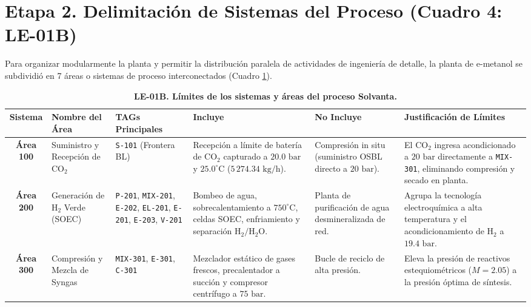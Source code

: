 \documentclass[10pt,letterpaper]{article}
\begin{document}
\section{Etapa 2. Delimitación de Sistemas del Proceso (Cuadro 4: LE-01B)}

Para organizar modularmente la planta y permitir la distribución paralela de actividades de ingeniería de detalle, la planta de e-metanol se subdividió en 7 áreas o sistemas de proceso interconectados (Cuadro \ref{tab:cuadro4}).

\begin{table}[H]
\centering
\small
\caption{\textbf{LE-01B. Límites de los sistemas y áreas del proceso Solvanta.}} \label{tab:cuadro4}
\begin{tabularx}{\textwidth}{c p{2.2cm} p{1.8cm} p{3.0cm} p{2.2cm} X}
\toprule
\textbf{Sistema} & \textbf{Nombre del Área} & \textbf{TAGs Principales} & \textbf{Incluye} & \textbf{No Incluye} & \textbf{Justificación de Límites} \\
\midrule
\textbf{Área 100} & Suministro y Recepción de $\text{CO}_2$ & \texttt{S-101} (Frontera BL) & Recepción a límite de batería de $\text{CO}_2$ capturado a $20.0\text{ bar}$ y $25.0^\circ\text{C}$ ($5\,274.34\text{ kg/h}$). & Compresión in situ (suministro OSBL directo a $20\text{ bar}$). & El $\text{CO}_2$ ingresa acondicionado a $20\text{ bar}$ directamente a \texttt{MIX-301}, eliminando compresión y secado en planta. \\
\textbf{Área 200} & Generación de $\text{H}_2$ Verde (SOEC) & \texttt{P-201}, \texttt{MIX-201}, \texttt{E-202}, \texttt{EL-201}, \texttt{E-201}, \texttt{E-203}, \texttt{V-201} & Bombeo de agua, sobrecalentamiento a $750^\circ\text{C}$, celdas SOEC, enfriamiento y separación $\text{H}_2/\text{H}_2\text{O}$. & Planta de purificación de agua desmineralizada de red. & Agrupa la tecnología electroquímica a alta temperatura y el acondicionamiento de $\text{H}_2$ a $19.4\text{ bar}$. \\
\textbf{Área 300} & Compresión y Mezcla de Syngas & \texttt{MIX-301}, \texttt{E-301}, \texttt{C-301} & Mezclador estático de gases frescos, precalentador a succión y compresor centrífugo a $75\text{ bar}$. & Bucle de reciclo de alta presión. & Eleva la presión de reactivos estequiométricos ($M=2.05$) a la presión óptima de síntesis. \\

\end{tabularx}
\end{table}
\end{document}
